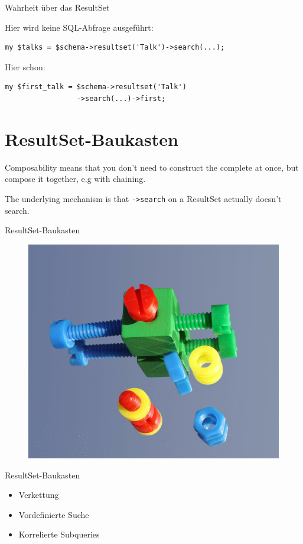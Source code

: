 \begin{frame}[fragile]{Wahrheit über das ResultSet}

Hier wird keine SQL-Abfrage ausgeführt:

\begin{lstlisting}
my $talks = $schema->resultset('Talk')->search(...);
\end{lstlisting}

Hier schon:

\begin{lstlisting}
my $first_talk = $schema->resultset('Talk')
                 ->search(...)->first;
\end{lstlisting}

\end{frame}

\section{ResultSet-Baukasten}

Composability means that you don't need to construct the
complete at once, but compose it together, e.g with
chaining.

The underlying mechanism is that \verb|->search| on a
ResultSet actually doesn't search.


\begin{frame}{ResultSet-Baukasten}
\begin{figure}[!ht]
\centering
\includegraphics[width=0.70\linewidth]{img/baukasten.jpg}
\end{figure}
\end{frame}

\begin{frame}{ResultSet-Baukasten}
\begin{itemize}
\item Verkettung
\item Vordefinierte Suche
\item Korrelierte Subqueries
\end{itemize}
\end{frame}

